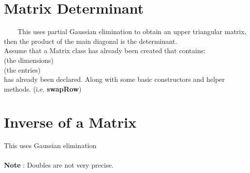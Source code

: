 	
	
	\section{Matrix Determinant}
	
	\ \ \ \ This uses partial Gaussian elimination to obtain an upper triangular matrix, 
	then the product of the main diagonal is the determinant.\\
	Assume that a Matrix class has already been created that contains:\\
	 (the dimensions)\\
	 (the entries)\\
	has already been declared. Along with some basic constructors and helper 
	methods. (i.e. {\bf swapRow})
	
	 
	
	\section{Inverse of a Matrix}
	
	This uses Gaussian elimination\\
	\ \\
	{\bf Note} : Doubles are not very precise. \\
	
	
	
